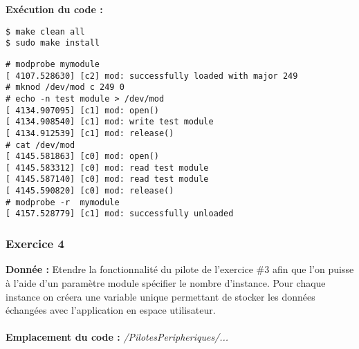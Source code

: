 \textbf{Exécution du code : } \\
\begin{lstlisting}
$ make clean all
$ sudo make install
\end{lstlisting}
\begin{lstlisting}
# modprobe mymodule                                                             
[ 4107.528630] [c2] mod: successfully loaded with major 249                     
# mknod /dev/mod c 249 0                                                        
# echo -n test module > /dev/mod                                                
[ 4134.907095] [c1] mod: open()                                                 
[ 4134.908540] [c1] mod: write test module                                      
[ 4134.912539] [c1] mod: release()                                              
# cat /dev/mod                                                                  
[ 4145.581863] [c0] mod: open()                                                 
[ 4145.583312] [c0] mod: read test module                                       
[ 4145.587140] [c0] mod: read test module                                       
[ 4145.590820] [c0] mod: release()                                              
# modprobe -r  mymodule                                                         
[ 4157.528779] [c1] mod: successfully unloaded   
\end{lstlisting}

\subsubsection{Exercice 4}
\textbf{Donnée : } Etendre	la	fonctionnalité	du	pilote	de	l’exercice	\#3 afin	que	l’on	puisse	à	l’aide	d’un	paramètre	
module	spécifier	le	nombre	d’instance.	Pour	chaque	instance	on	créera	une	variable	unique	
permettant	de	stocker	les	données	échangées	avec	l’application	en	espace	utilisateur.\\\\
\textbf{Emplacement du code : } \textit{/PilotesPeripheriques/...}\\

